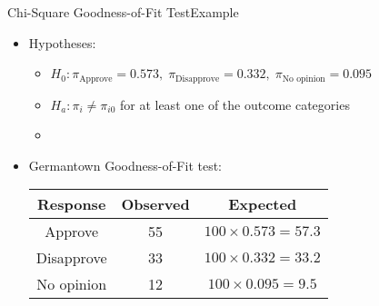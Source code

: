 \documentclass[xcolor=dvipsnames]{beamer}
\begin{document}
\begin{frame}{Chi-Square Goodness-of-Fit Test}{Example}
	\begin{itemize}
		\item Hypotheses:
		\begin{itemize}
			\item $H_0: \pi_{\text{Approve}} = 0.573,\; \pi_{\text{Disapprove}} = 0.332,\; \pi_{\text{No opinion}}=0.095$
			\item $H_a: \pi_i \neq \pi_{i0}$ for at least one of the outcome categories
			\item[]
		\end{itemize}
	\item Germantown Goodness-of-Fit test:
	\vspace{1mm}
	\begin{center}
		\begin{tabular}{ccc}
			\hline
			Response & Observed & Expected \\ \hline \hline
			Approve & 55 & $100 \times 0.573 = 57.3$\\
			Disapprove & 33 & $100 \times 0.332 = 33.2$ \\
			No opinion & 12 & $100 \times 0.095 = 9.5$ \\ \hline
		\end{tabular}
	\end{center}
	\end{itemize}
\end{frame}
\end{document}

